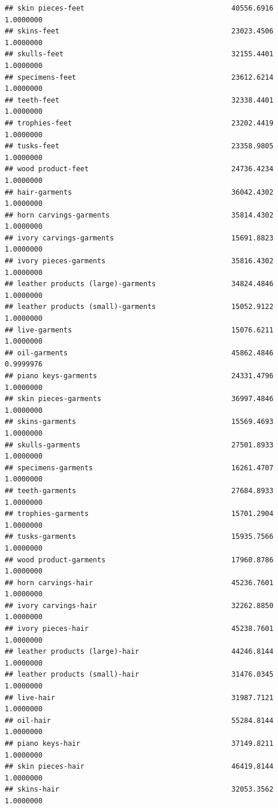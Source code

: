 \documentclass[
  12pt,
]{article}
\begin{document}
\begin{verbatim}
## skin pieces-feet                                   40556.6916 1.0000000
## skins-feet                                         23023.4506 1.0000000
## skulls-feet                                        32155.4401 1.0000000
## specimens-feet                                     23612.6214 1.0000000
## teeth-feet                                         32338.4401 1.0000000
## trophies-feet                                      23202.4419 1.0000000
## tusks-feet                                         23358.9805 1.0000000
## wood product-feet                                  24736.4234 1.0000000
## hair-garments                                      36042.4302 1.0000000
## horn carvings-garments                             35814.4302 1.0000000
## ivory carvings-garments                            15691.8823 1.0000000
## ivory pieces-garments                              35816.4302 1.0000000
## leather products (large)-garments                  34824.4846 1.0000000
## leather products (small)-garments                  15052.9122 1.0000000
## live-garments                                      15076.6211 1.0000000
## oil-garments                                       45862.4846 0.9999976
## piano keys-garments                                24331.4796 1.0000000
## skin pieces-garments                               36997.4846 1.0000000
## skins-garments                                     15569.4693 1.0000000
## skulls-garments                                    27501.8933 1.0000000
## specimens-garments                                 16261.4707 1.0000000
## teeth-garments                                     27684.8933 1.0000000
## trophies-garments                                  15701.2904 1.0000000
## tusks-garments                                     15935.7566 1.0000000
## wood product-garments                              17960.8786 1.0000000
## horn carvings-hair                                 45236.7601 1.0000000
## ivory carvings-hair                                32262.8850 1.0000000
## ivory pieces-hair                                  45238.7601 1.0000000
## leather products (large)-hair                      44246.8144 1.0000000
## leather products (small)-hair                      31476.0345 1.0000000
## live-hair                                          31987.7121 1.0000000
## oil-hair                                           55284.8144 1.0000000
## piano keys-hair                                    37149.8211 1.0000000
## skin pieces-hair                                   46419.8144 1.0000000
## skins-hair                                         32053.3562 1.0000000

\end{verbatim}
\end{document}
